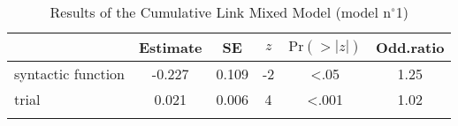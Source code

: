 \begin{table}
\begin{tabular}{l S[table-format=-1.3] S[table-format=1.3] S[table-format=-1] S[table-format=<1.3] S[table-format=1.2]}
  \lsptoprule
 & {Estimate} & {SE} & {$z$} & {$\text{Pr}(>|z|)$} & {Odd.ratio} \\ 
  \midrule
  syntactic function & -0.227 & 0.109 & -2 & <.05 & 1.25 \\ 
  trial & 0.021 & 0.006 & 4 & <.001 & 1.02 \\ 
   \lspbottomrule
\end{tabular}
\caption{Results of the Cumulative Link Mixed Model (model n$^{\circ}$1)}
\label{tab:exp04-m1}
\end{table}
